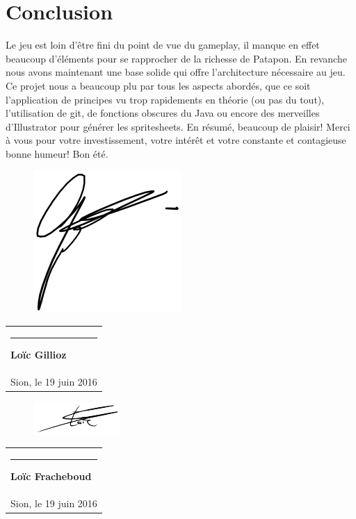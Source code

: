 \documentclass[a4paper,10pt]{article}
\newcommand{\signature}[2]{%
  \par\nobreak\bigskip
  \begin{singlespace}%
  \mbox{}\hfill\begin{tabular}{p{8cm} }
      \rule{8cm}{0.5pt}\newline{}%
        \textbf{#1}\\%
       #2 %
  \end{tabular}%
  \end{singlespace}%
  \medskip%
 }
\begin{document}
 \pagebreak
 \section{Conclusion}
 Le jeu est loin d'être fini du point de vue du gameplay, il manque en effet beaucoup d'éléments pour se rapprocher de la richesse de Patapon. En revanche nous avons maintenant une base solide qui offre l'architecture nécessaire au jeu.
 \newline Ce projet nous a beaucoup plu par tous les aspects abordés, que ce soit l'application de principes vu trop rapidements en théorie (ou pas du tout), l'utilisation de git, de fonctions obscures du Java ou encore des merveilles d'Illustrator pour générer les spritesheets.
 \newline En résumé, beaucoup de plaisir!
Merci à vous pour votre investissement, votre intérêt et votre constante et contagieuse bonne humeur!
 Bon été.
 
 \vspace{30pt}
 \begin{figure}
 \vspace{-52pt}
 \centering
 \includegraphics[scale=0.5]{signgillioz}
 \end{figure}
 \signature{Loïc Gillioz}{Sion, le 19 juin 2016} 
 
 \begin{figure}
 \vspace{-52pt}
 \centering
 \includegraphics[scale=1]{signfracheboud}
 \end{figure}
 \signature{Loïc Fracheboud}{Sion, le 19 juin 2016} 
 
\end{document}
